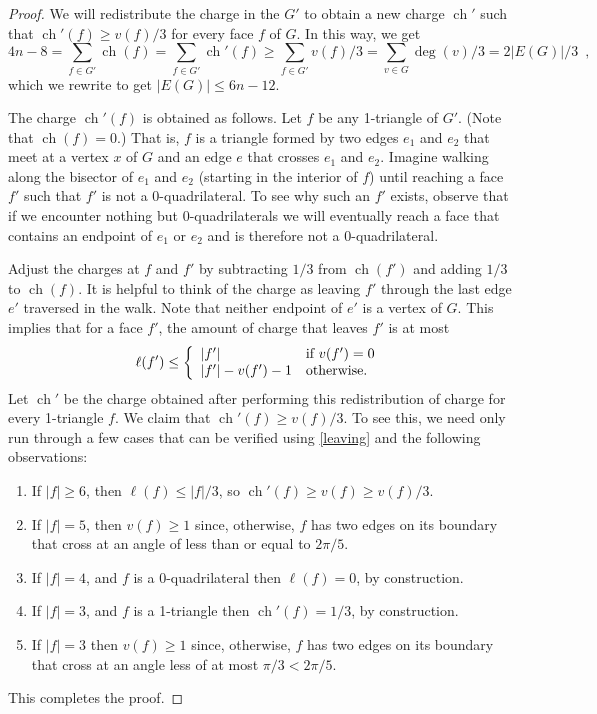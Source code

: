 \documentclass[lotsofwhite,charterfonts]{patmorin}
\DeclareMathOperator{\ch}{ch}
\begin{document}
\begin{proof}
We will redistribute the charge in the $G'$ to obtain a new charge $\ch'$
such that $\ch'(f) \ge v(f)/3$ for every face $f$ of $G$.  In this way, we
get
\[
 4n-8 = \sum_{f\in G'} \ch(f) 
   = \sum_{f\in G'} \ch'(f) \ge
 \sum_{f\in G'} v(f)/3 = \sum_{v\in G} \deg(v)/3 = 2|E(G)|/3 \enspace ,
\]
which we rewrite to get $|E(G)| \le 6n-12$.

The charge $\ch'(f)$ is obtained as follows.  Let $f$ be any 1-triangle of
$G'$.  (Note that $\ch(f) = 0$.)   That is, $f$ is a triangle formed by two
edges $e_1$ and $e_2$ that meet at a vertex $x$ of $G$ and an edge $e$ that
crosses $e_1$ and $e_2$.
Imagine walking along the bisector of $e_1$ and $e_2$ (starting in the
interior of $f$) until reaching a face $f'$ such that $f'$ is not a
0-quadrilateral.  To see why such an $f'$ exists, observe that if we
encounter nothing but 0-quadrilaterals we will eventually reach a face that
contains an endpoint of $e_1$ or $e_2$ and is therefore not a
0-quadrilateral.

Adjust the charges at $f$ and $f'$ by subtracting $1/3$ from $\ch(f')$ and
adding $1/3$ to $\ch(f)$.  It is helpful to think of the charge as leaving
$f'$ through the last edge $e'$ traversed in the walk.  Note that neither
endpoint of $e'$ is a vertex of $G$.  This implies that for a face $f'$,
the amount of charge that leaves $f'$ is at most 
\begin{equation}
   \ell(f') \le \left\{
            \begin{array}{ll}
              |f'|         & \mbox{if $v(f')=0$} \\
              |f'| - v(f') - 1 & \mbox{otherwise.}
            \end{array}
          \right.
  \eqlabel{leaving}
\end{equation}
Let $\ch'$ be the charge obtained after performing this redistribution of
charge for every 1-triangle $f$.  We claim that $\ch'(f) \ge v(f)/3$.  To
see this, we need only run through a few cases that can be verified using
\eqref{leaving} and the following observations:

\begin{enumerate}
\item If $|f|\ge 6$, then $\ell(f) \le |f|/3$, so $\ch'(f) \ge v(f) \ge v(f)/3$.

\item If $|f|=5$, then $v(f) \ge 1$ since, otherwise, $f$ has two edges on
its boundary that cross at an angle of less than or equal to $2\pi/5$.

\item If $|f|=4$, and $f$ is a 0-quadrilateral then $\ell(f)=0$, by construction.

\item If $|f|=3$, and $f$ is a 1-triangle then $\ch'(f)=1/3$, by construction. 

\item If $|f|=3$ then $v(f)\ge 1$ since, otherwise, $f$ has two edges on
its boundary that cross at an angle less of at most $\pi/3 < 2\pi/5$.
\end{enumerate}
This completes the proof.
\end{proof}
\end{document}
